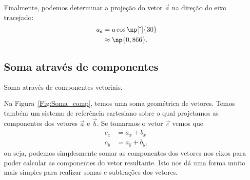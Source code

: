 Finalmente, podemos determinar a projeção do vetor $\vec{a}$ na direção do eixo tracejado:
\begin{align}
    a_e &= a\cos\np[\tcdegree]{30} \\
    &\approx \np{0,866}.
\end{align}

\subsection{Soma através de componentes}

\begin{marginfigure}[4cm]
\centering
{}
\caption{Soma através de componentes vetoriais.\label{Fig:Soma_comp}}
\end{marginfigure}

Na Figura~\ref{Fig:Soma_comp}, temos uma soma geométrica de vetores. Temos também um sistema de referência cartesiano sobre o qual projetamos as componentes dos vetores $\vec{a}$ e $\vec{b}$. Se tomarmos o vetor $\vec{c}$ vemos que
\begin{align}
  c_x &= a_x + b_x \\
  c_y &= a_y + b_y,
\end{align}
%
ou seja, podemos simplesmente somar as componentes dos vetores nos eixos para poder calcular as componentes do vetor resultante. Isto nos dá uma forma muito mais simples para realizar somas e subtrações dos vetores.

